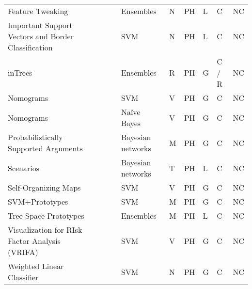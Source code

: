 \documentclass[final,1p,times]{elsarticle}
\begin{document}
\begin{table}[htbp]
\begin{tabular}{m{2.3cm} m{1.4cm} m{0.5cm} m{0.5cm} m{1.5cm} m{0.85cm} m{0.5cm} m{0.6cm} m{0.8cm} m{0.8cm}}
    Feature Tweaking &  \citeauthor{tolomei2017interpretable} &  \cite{tolomei2017interpretable} &  \citeyear{tolomei2017interpretable} & Ensembles & N & PH & L & C & NC\\
    Important Support Vectors and Border Classification &  \citeauthor{barbella2009understanding} &  \cite{barbella2009understanding} &  \citeyear{barbella2009understanding} & SVM & N & PH & L & C & NC\\
    inTrees &  \citeauthor{deng2018interpreting} &  \cite{deng2018interpreting} &  \citeyear{deng2018interpreting} &  Ensembles & R & PH & G & C / R & NC\\
    Nomograms &  \citeauthor{jakulin2005nomograms} &  \cite{jakulin2005nomograms} &  \citeyear{jakulin2005nomograms} & SVM & V & PH & G & C & NC\\
    Nomograms &  \citeauthor{movzina2004nomograms} &  \cite{movzina2004nomograms} &  \citeyear{movzina2004nomograms} & Na\"{i}ve Bayes & V & PH & G & C & NC\\
    Probabilistically Supported Arguments &  \citeauthor{timmer2017two} &  \cite{timmer2017two} &  \citeyear{timmer2017two} & Bayesian networks & M & PH & G & C & NC\\
    Scenarios &  \citeauthor{vlek2016method} &  \cite{vlek2016method} &  \citeyear{vlek2016method} & Bayesian networks & T & PH & L & C & NC\\
    Self-Organizing Maps &  \citeauthor{hamel2006visualization} &  \cite{hamel2006visualization} &  \citeyear{hamel2006visualization} & SVM & V & PH & G & C & NC\\
    SVM+Prototypes &  \citeauthor{nunez2002rule} &  \cite{nunez2002rule} &  \citeyear{nunez2002rule} & SVM & M & PH & G & C & NC\\
    Tree Space Prototypes &  \citeauthor{tan2016tree} &  \cite{tan2016tree} &  \citeyear{tan2016tree} & Ensembles & M & PH & L & C & NC\\
    Visualization for RIsk Factor Analysis (VRIFA) &  \citeauthor{cho2008nonlinear} &  \cite{cho2008nonlinear} &  \citeyear{cho2008nonlinear} & SVM & V & PH & G & C & NC\\
    Weighted Linear Classifier &  \citeauthor{caragea2003towards} &  \cite{caragea2003towards} &  \citeyear{caragea2003towards} & SVM & N & PH & G & C & NC\\
    \hline
\end{tabular}
\end{table}
\end{document}
